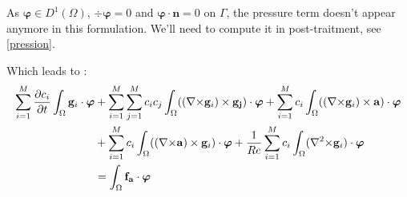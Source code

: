 \begin{rk}
As $\bm{\varphi}\in D^1(\Omega)$, $\div\bm{\varphi}=0$ and $\bm{\varphi}\cdot \mathbf{n}=0$ on $\Gamma$, the pressure term doesn't appear anymore in this formulation. We'll need to compute it in post-traitment, see \ref{pression}.
\end{rk}
Which leads to :
\begin{align*}
\sum_{i=1}^M\frac{\partial c_i}{\partial t}\int_\Omega\mathbf{g}_i\cdot\bm{\varphi} &+ \sum_{i=1}^M\sum_{j=1}^Mc_ic_j\int_\Omega(({\nabla\times}\mathbf{g}_i)\times \mathbf{g_j})\cdot\bm{\varphi} + \sum_{i=1}^Mc_i\int_\Omega(({\nabla\times}\mathbf{g}_i)\times \mathbf{a})\cdot\bm{\varphi}\\
& +  \sum_{i=1}^Mc_i\int_\Omega(({\nabla\times}\mathbf{a})\times \mathbf{g}_i)\cdot\bm{\varphi} + \frac{1}{Re}\sum_{i=1}^Mc_i\int_\Omega({\nabla^2\times}\mathbf{g}_i)\cdot\bm{\varphi}\\
& = \int_\Omega\mathbf{f_a}\cdot\bm{\varphi}\\
\end{align*}

